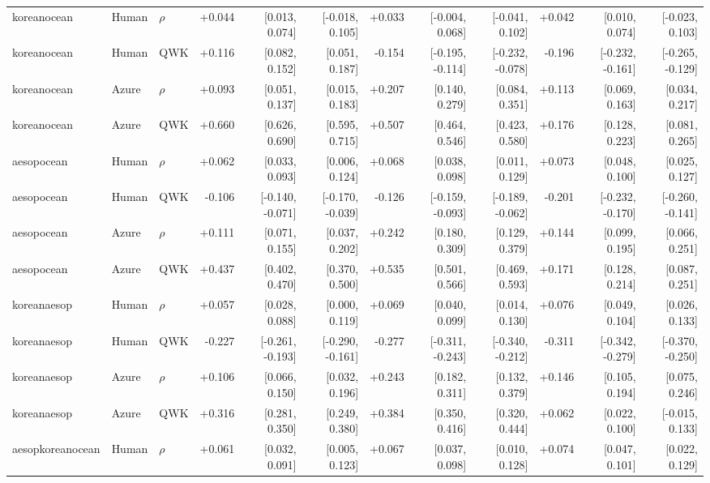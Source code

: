 \documentclass[10pt]{article}
\begin{document}
\begin{landscape}
\begin{longtable}{@{}lllrrrrrrrrr@{}}
\addlinespace[2pt]
koreanocean & Human & $\rho$ & +0.044 & [0.013, 0.074] & [-0.018, 0.105] & +0.033 & [-0.004, 0.068] & [-0.041, 0.102] & +0.042 & [0.010, 0.074] & [-0.023, 0.103]\\
koreanocean & Human & QWK & +0.116 & [0.082, 0.152] & [0.051, 0.187] & -0.154 & [-0.195, -0.114] & [-0.232, -0.078] & -0.196 & [-0.232, -0.161] & [-0.265, -0.129]\\
koreanocean & Azure & $\rho$ & +0.093 & [0.051, 0.137] & [0.015, 0.183] & +0.207 & [0.140, 0.279] & [0.084, 0.351] & +0.113 & [0.069, 0.163] & [0.034, 0.217]\\
koreanocean & Azure & QWK & +0.660 & [0.626, 0.690] & [0.595, 0.715] & +0.507 & [0.464, 0.546] & [0.423, 0.580] & +0.176 & [0.128, 0.223] & [0.081, 0.265]\\
\addlinespace[2pt]
aesopocean & Human & $\rho$ & +0.062 & [0.033, 0.093] & [0.006, 0.124] & +0.068 & [0.038, 0.098] & [0.011, 0.129] & +0.073 & [0.048, 0.100] & [0.025, 0.127]\\
aesopocean & Human & QWK & -0.106 & [-0.140, -0.071] & [-0.170, -0.039] & -0.126 & [-0.159, -0.093] & [-0.189, -0.062] & -0.201 & [-0.232, -0.170] & [-0.260, -0.141]\\
aesopocean & Azure & $\rho$ & +0.111 & [0.071, 0.155] & [0.037, 0.202] & +0.242 & [0.180, 0.309] & [0.129, 0.379] & +0.144 & [0.099, 0.195] & [0.066, 0.251]\\
aesopocean & Azure & QWK & +0.437 & [0.402, 0.470] & [0.370, 0.500] & +0.535 & [0.501, 0.566] & [0.469, 0.593] & +0.171 & [0.128, 0.214] & [0.087, 0.251]\\
\addlinespace[2pt]
koreanaesop & Human & $\rho$ & +0.057 & [0.028, 0.088] & [0.000, 0.119] & +0.069 & [0.040, 0.099] & [0.014, 0.130] & +0.076 & [0.049, 0.104] & [0.026, 0.133]\\
koreanaesop & Human & QWK & -0.227 & [-0.261, -0.193] & [-0.290, -0.161] & -0.277 & [-0.311, -0.243] & [-0.340, -0.212] & -0.311 & [-0.342, -0.279] & [-0.370, -0.250]\\
koreanaesop & Azure & $\rho$ & +0.106 & [0.066, 0.150] & [0.032, 0.196] & +0.243 & [0.182, 0.311] & [0.132, 0.379] & +0.146 & [0.105, 0.194] & [0.075, 0.246]\\
koreanaesop & Azure & QWK & +0.316 & [0.281, 0.350] & [0.249, 0.380] & +0.384 & [0.350, 0.416] & [0.320, 0.444] & +0.062 & [0.022, 0.100] & [-0.015, 0.133]\\
\addlinespace[2pt]
aesopkoreanocean & Human & $\rho$ & +0.061 & [0.032, 0.091] & [0.005, 0.123] & +0.067 & [0.037, 0.098] & [0.010, 0.128] & +0.074 & [0.047, 0.101] & [0.022, 0.129]\\

\end{longtable}
\end{landscape}
\end{document}
